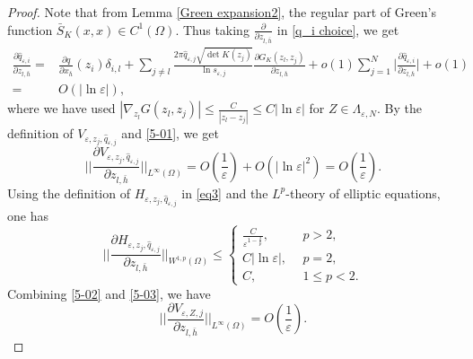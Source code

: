 \documentclass[12pt,reqno]{amsart}
\numberwithin{equation}{section}
\theoremstyle{definition}
\theoremstyle{remark}
\begin{document}
\begin{proof}
Note that from Lemma \ref{Green expansion2}, the regular part of Green's function $ \bar{S}_K(x,x)\in C^1(\Omega) $. Thus taking $ \frac{\partial}{\partial z_{l,\bar{h}}} $ in  \eqref{q_i choice}, we get
\begin{equation}\label{5-01}
\begin{split}
\frac{\partial \hat{q}_{\varepsilon,i}}{\partial z_{l,\bar{h}}}=&\frac{\partial q}{\partial x_{\bar{h}}}(z_i)\delta_{i,l}+\sum_{j\neq l}\frac{2\pi\hat{q}_{\varepsilon,j}\sqrt{\det K(z_j)}}{\ln s_{\varepsilon,j}}\frac{\partial G_K(z_l,z_j)}{\partial z_{l,\bar{h}}}+o(1)\sum_{j=1}^N\bigg|\frac{\partial \hat{q}_{\varepsilon,i}}{\partial z_{l,\bar{h}}}\bigg|+o(1)\\
=&O\left (|\ln\varepsilon|\right ),
\end{split}
\end{equation}
where we have used $ |\nabla_{z_l} G(z_l, z_j)|\leq\frac{ C}{|z_l-z_j|}\leq C|\ln\varepsilon| $ for $ Z\in \Lambda_{\varepsilon, N}. $ By the definition of $ V_{\varepsilon, z_j, \hat{q}_{\varepsilon,j}} $ and \eqref{5-01}, we get
\begin{equation}\label{5-02}
\bigg|\bigg|\frac{\partial V_{\varepsilon, z_j, \hat{q}_{\varepsilon,j}}}{\partial z_{l,\bar{h}}}\bigg|\bigg|_{L^\infty(\Omega)}=O\left (\frac{1}{\varepsilon}\right )+O\left (|\ln\varepsilon|^2\right )=O\left (\frac{1}{\varepsilon}\right ).
\end{equation}
Using the definition of $ H_{\varepsilon, z_j, \hat{q}_{\varepsilon,j}} $ in \eqref{eq3} and the $ L^p $-theory of elliptic equations, one has
\begin{equation}\label{5-03}
\bigg|\bigg|\frac{\partial H_{\varepsilon, z_j, \hat{q}_{\varepsilon,j}}}{\partial z_{l,\bar{h}}}\bigg|\bigg|_{W^{1,p}(\Omega)}\leq
\begin{cases}
\frac{C}{\varepsilon^{1-\frac{2}{p}}},\ \ &p>2,\\
C|\ln\varepsilon|,\ \ &p=2,\\
C,\ \ &1\leq p<2.
\end{cases}
\end{equation}
Combining \eqref{5-02} and \eqref{5-03}, we have
\begin{equation}\label{5-04}
\bigg|\bigg|\frac{\partial V_{\varepsilon, Z, j}}{\partial z_{l,\bar{h}}}\bigg|\bigg|_{L^\infty(\Omega)}=O\left (\frac{1}{\varepsilon}\right ).
\end{equation}


\end{proof}
\end{document}
